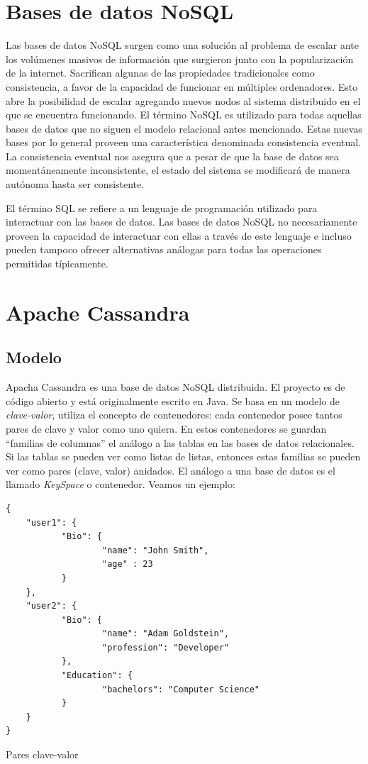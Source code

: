 \documentclass[11pt,a4paper]{article}
\begin{document}
\section{Bases de datos NoSQL}
Las bases de datos NoSQL surgen como una solución al problema de escalar ante los volúmenes masivos de información que surgieron junto con la popularización de la internet. Sacrifican algunas de las propiedades tradicionales como consistencia, a favor de la capacidad de funcionar en múltiples ordenadores. Esto abre la posibilidad de escalar agregando nuevos nodos al sistema distribuido en el que se encuentra funcionando. El término NoSQL es utilizado para todas aquellas bases de datos que no siguen el modelo relacional antes mencionado. Estas nuevas bases por lo general proveen una característica denominada consistencia eventual. La consistencia eventual nos asegura que a pesar de que la base de datos sea momentáneamente inconsistente, el estado del sistema se modificará de manera autónoma hasta ser consistente.

El término SQL se refiere a un lenguaje de programación utilizado para interactuar con las bases de datos. Las bases de datos NoSQL no necesariamente proveen la capacidad de interactuar con ellas a través de este lenguaje e incluso pueden tampoco ofrecer alternativas análogas para todas las operaciones permitidas típicamente.

\section{Apache Cassandra}
\subsection{Modelo}
Apacha Cassandra es una base de datos NoSQL distribuida. El proyecto es de código abierto y está originalmente escrito en Java. Se basa en un modelo de \textit{clave-valor}, utiliza el concepto de contenedores: cada contenedor posee tantos pares de clave y valor como uno quiera. En estos contenedores se guardan ``familias de columnas'' el análogo a las tablas en las bases de datos relacionales. Si las tablas se pueden ver como listas de listas, entonces estas familias se pueden ver como pares (clave, valor) anidados. El análogo a una base de datos es el llamado \textit{KeySpace} o contenedor. Veamos un ejemplo:

\begin{listing}
\begin{verbatim}
{
	"user1": {
           "Bio": {
                   "name": "John Smith",
                   "age" : 23
           }
    },
    "user2": {
           "Bio": {
                   "name": "Adam Goldstein",
                   "profession": "Developer"
           },
           "Education": {
                   "bachelors": "Computer Science"
           }
    }
}
\end{verbatim}
\caption{Pares clave-valor} 
\label{json-example}
\end{listing}
\end{document}
